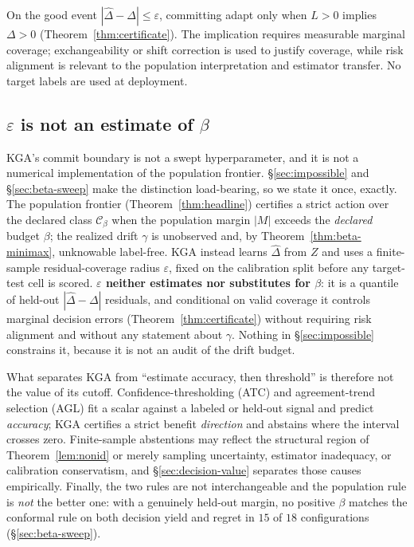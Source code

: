 On the good event $|\widehat\Delta-\Delta|\le\varepsilon$, committing adapt only when
$L>0$ implies $\Delta>0$ (Theorem~\ref{thm:certificate}). The implication requires measurable
marginal coverage; exchangeability or shift correction is used to justify coverage, while risk
alignment is relevant to the population interpretation and estimator transfer. No target labels are
used at deployment.

\subsection{$\varepsilon$ is not an estimate of $\beta$}
\textsc{KGA}'s commit boundary is not a swept hyperparameter, and it is not a numerical
implementation of the population frontier. \S\ref{sec:impossible} and \S\ref{sec:beta-sweep} make
the distinction load-bearing, so we state it once, exactly. The population frontier
(Theorem~\ref{thm:headline}) certifies a strict action over the declared class $\mathcal C_\beta$
when the population margin $|M|$ exceeds the \emph{declared} budget $\beta$; the realized drift
$\gamma$ is unobserved and, by Theorem~\ref{thm:beta-minimax}, unknowable label-free. \textsc{KGA}
instead learns $\widehat\Delta$ from $Z$ and uses a finite-sample residual-coverage radius
$\varepsilon$, fixed on the calibration split before any target-test cell is scored.
\textbf{$\varepsilon$ neither estimates nor substitutes for $\beta$}: it is a quantile of held-out
$|\widehat\Delta-\Delta|$ residuals, and conditional on valid coverage it controls marginal decision
errors (Theorem~\ref{thm:certificate}) without requiring risk alignment and without any statement
about $\gamma$. Nothing in \S\ref{sec:impossible} constrains it, because it is not an audit of the
drift budget.

What separates \textsc{KGA} from ``estimate accuracy, then threshold'' is therefore not the value of
its cutoff. Confidence-thresholding (ATC) and agreement-trend selection (AGL) fit a scalar against a
labeled or held-out signal and predict \emph{accuracy}; \textsc{KGA} certifies a strict benefit
\emph{direction} and abstains where the interval crosses zero. Finite-sample abstentions may reflect
the structural region of Theorem~\ref{lem:nonid} or merely sampling uncertainty, estimator
inadequacy, or calibration conservatism, and \S\ref{sec:decision-value} separates those causes
empirically. Finally, the two rules are not interchangeable and the population rule is \emph{not} the
better one: with a genuinely held-out margin, no positive $\beta$ matches the conformal rule on both
decision yield and regret in $15$ of $18$ configurations (\S\ref{sec:beta-sweep}).

